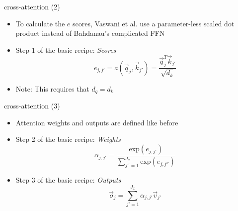 \documentclass[11pt,compress,t,notes=noshow, xcolor=table]{beamer}
\begin{document}

\begin{vbframe}{cross-attention (2)}

\vfill

\begin{itemize}
	\item To calculate the $e$ scores, Vaswani et al. use a parameter-less scaled dot product instead of Bahdanau's complicated FFN\medskip\medskip
	\item Step 1 of the basic recipe: \textit{Scores}
	$$ e_{j,j'} = a(\vec q_j, \vec k_{j'}) = \frac{\vec q_j^T \vec k_{j'}}{\sqrt{d_k}} $$
	\item Note: This requires that $d_q = d_k$
\end{itemize}

\vfill

\end{vbframe}


\begin{vbframe}{cross-attention (3)}

\vfill

\begin{itemize}
	\item Attention weights and outputs are defined like before\medskip\medskip
	\item Step 2 of the basic recipe: \textit{Weights}
	$$ \alpha_{j,j'} = \frac{\mathrm{exp}(e_{j,j'})}{\sum_{j'' = 1}^{J_x} \mathrm{exp}(e_{j,j''})}$$
	\item Step 3 of the basic recipe: \textit{Outputs}
	$$ \vec o_j = \sum_{j'=1}^{J_x} \alpha_{j,j'} \vec v_{j'}$$
\end{itemize}

\vfill

\end{vbframe}

\end{document}
